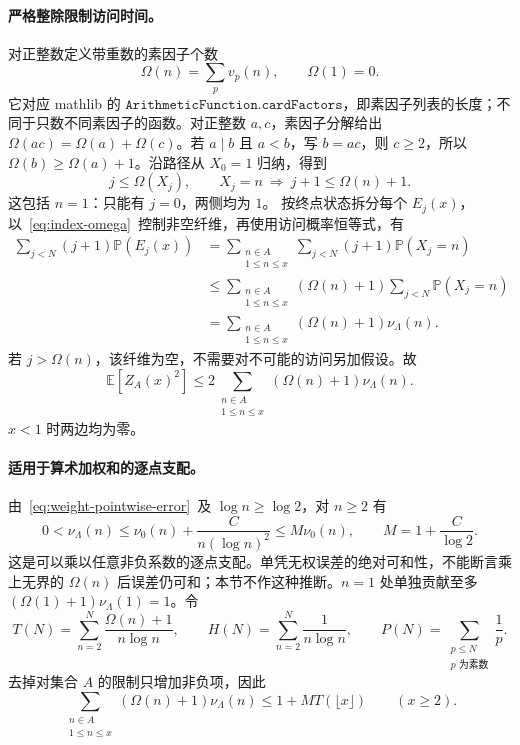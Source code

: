 \paragraph{严格整除限制访问时间。}
对正整数定义带重数的素因子个数
\[
 \Omega(n)=\sum_p v_p(n),\qquad\Omega(1)=0.
\]
它对应 mathlib 的 $\texttt{ArithmeticFunction.cardFactors}$，即素因子列表的长度；不同于只数不同素因子的函数。对正整数 $a,c$，素因子分解给出
$\Omega(ac)=\Omega(a)+\Omega(c)$。若 $a\mid b$ 且 $a<b$，写 $b=ac$，则 $c\ge2$，所以 $\Omega(b)\ge\Omega(a)+1$。沿路径从 $X_0=1$ 归纳，得到
\begin{equation}\label{eq:index-omega}
 j\le\Omega(X_j),\qquad
 X_j=n\ \Longrightarrow\ j+1\le\Omega(n)+1.
\end{equation}
这包括 $n=1$：只能有 $j=0$，两侧均为 $1$。
按终点状态拆分每个 $E_j(x)$，以~\eqref{eq:index-omega}~控制非空纤维，再使用访问概率恒等式，有
\begin{align*}
 \sum_{j<N}(j+1)\mathbb P(E_j(x))
 &=\sum_{\substack{n\in A\\1\le n\le x}}\sum_{j<N}(j+1)\mathbb P(X_j=n)\\
 &\le\sum_{\substack{n\in A\\1\le n\le x}}(\Omega(n)+1)
     \sum_{j<N}\mathbb P(X_j=n)\\
 &=\sum_{\substack{n\in A\\1\le n\le x}}(\Omega(n)+1)\nu_\Lambda(n).
\end{align*}
若 $j>\Omega(n)$，该纤维为空，不需要对不可能的访问另加假设。故
\begin{equation}\label{eq:moment-terminal-bound}
 \boxed{\mathbb E[Z_A(x)^2]
 \le2\sum_{\substack{n\in A\\1\le n\le x}}(\Omega(n)+1)\nu_\Lambda(n).}
\end{equation}
$x<1$ 时两边均为零。

\paragraph{适用于算术加权和的逐点支配。}
由~\eqref{eq:weight-pointwise-error}~及 $\log n\ge\log2$，对 $n\ge2$ 有
\begin{equation}\label{eq:weight-multiplicative-domination}
 0<\nu_\Lambda(n)\le\nu_0(n)
       +\frac{C}{n(\log n)^2}
 \le M\nu_0(n),\qquad M=1+\frac C{\log2}.
\end{equation}
这是可以乘以任意非负系数的逐点支配。单凭无权误差的绝对可和性，不能断言乘上无界的 $\Omega(n)$ 后误差仍可和；本节不作这种推断。$n=1$ 处单独贡献至多
$(\Omega(1)+1)\nu_\Lambda(1)=1$。令
\[
 T(N)=\sum_{n=2}^N\frac{\Omega(n)+1}{n\log n},\qquad
 H(N)=\sum_{n=2}^N\frac1{n\log n},\qquad
 P(N)=\sum_{\substack{p\le N\\p\text{ 为素数}}}\frac1p.
\]
去掉对集合 $A$ 的限制只增加非负项，因此
\begin{equation}\label{eq:mangoldt-terminal-comparison}
 \sum_{\substack{n\in A\\1\le n\le x}}(\Omega(n)+1)\nu_\Lambda(n)
 \le1+M T(\lfloor x\rfloor)\qquad(x\ge2).
\end{equation}

